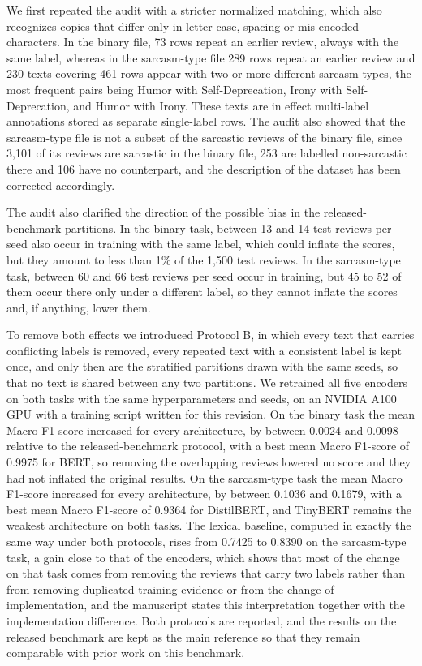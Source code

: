\documentclass[11pt,a4paper]{article}
\begin{document}
We first repeated the audit with a stricter normalized matching, which also recognizes copies that differ only in letter case, spacing or mis-encoded characters. In the binary file, 73 rows repeat an earlier review, always with the same label, whereas in the sarcasm-type file 289 rows repeat an earlier review and 230 texts covering 461 rows appear with two or more different sarcasm types, the most frequent pairs being Humor with Self-Deprecation, Irony with Self-Deprecation, and Humor with Irony. These texts are in effect multi-label annotations stored as separate single-label rows. The audit also showed that the sarcasm-type file is not a subset of the sarcastic reviews of the binary file, since 3,101 of its reviews are sarcastic in the binary file, 253 are labelled non-sarcastic there and 106 have no counterpart, and the description of the dataset has been corrected accordingly.

The audit also clarified the direction of the possible bias in the released-benchmark partitions. In the binary task, between 13 and 14 test reviews per seed also occur in training with the same label, which could inflate the scores, but they amount to less than 1\% of the 1,500 test reviews. In the sarcasm-type task, between 60 and 66 test reviews per seed occur in training, but 45 to 52 of them occur there only under a different label, so they cannot inflate the scores and, if anything, lower them.

To remove both effects we introduced Protocol B, in which every text that carries conflicting labels is removed, every repeated text with a consistent label is kept once, and only then are the stratified partitions drawn with the same seeds, so that no text is shared between any two partitions. We retrained all five encoders on both tasks with the same hyperparameters and seeds, on an NVIDIA A100 GPU with a training script written for this revision. On the binary task the mean Macro F1-score increased for every architecture, by between 0.0024 and 0.0098 relative to the released-benchmark protocol, with a best mean Macro F1-score of 0.9975 for BERT, so removing the overlapping reviews lowered no score and they had not inflated the original results. On the sarcasm-type task the mean Macro F1-score increased for every architecture, by between 0.1036 and 0.1679, with a best mean Macro F1-score of 0.9364 for DistilBERT, and TinyBERT remains the weakest architecture on both tasks. The lexical baseline, computed in exactly the same way under both protocols, rises from 0.7425 to 0.8390 on the sarcasm-type task, a gain close to that of the encoders, which shows that most of the change on that task comes from removing the reviews that carry two labels rather than from removing duplicated training evidence or from the change of implementation, and the manuscript states this interpretation together with the implementation difference. Both protocols are reported, and the results on the released benchmark are kept as the main reference so that they remain comparable with prior work on this benchmark.
\end{document}
